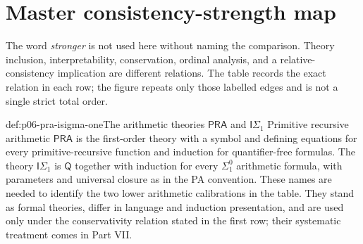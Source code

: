 \section{Master consistency-strength map}
\label{sec:p06-consistency-strength}

The word \emph{stronger} is not used here without naming the comparison.
Theory inclusion, interpretability, conservation, ordinal analysis, and a
relative-consistency implication are different relations.  The table records
the exact relation in each row; the figure repeats only those labelled edges
and is not a single strict total order.

\begin{hbdefinition}{def:p06-pra-isigma-one}{The arithmetic theories \(\mathsf{PRA}\) and \(\mathsf I\Sigma_1\)}
Primitive recursive arithmetic \(\mathsf{PRA}\) is the first-order theory
with a symbol and defining equations for every primitive-recursive function
and induction for quantifier-free formulas.  The theory
\(\mathsf I\Sigma_1\) is \(\mathsf Q\) together with induction for every
\(\Sigma^0_1\) arithmetic formula, with parameters and universal closure as
in the PA convention.  These names are needed to identify the two lower
arithmetic calibrations in the table.  They stand as formal theories, differ
in language and induction presentation, and are used only under the
conservativity relation stated in the first row; their systematic treatment
comes in Part VII.
\end{hbdefinition}

